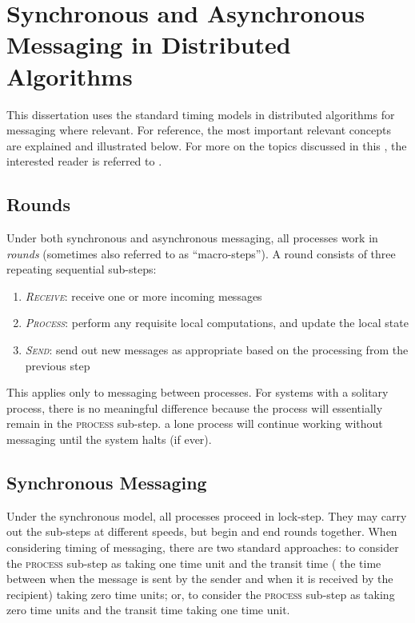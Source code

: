 \section{\label{sec:back:syncasync}Synchronous and Asynchronous Messaging in Distributed Algorithms}

This dissertation uses the standard timing models in distributed algorithms \cite{Lynch1996} for messaging where relevant.  For reference, the most important relevant concepts are explained and illustrated below.  For more on the topics discussed in this , the interested reader is referred to \cite{Fokkink2013,Lynch1996,Tel2000}.

\subsection{Rounds}
Under both synchronous and asynchronous messaging, all processes work in \emph{rounds} (sometimes also referred to as ``macro-steps'').  A round consists of three repeating sequential sub-steps:
\begin{enumerate}
    \item \emph{\textsc{Receive}}:  receive one or more incoming messages
    \item \emph{\textsc{Process}}:  perform any requisite local computations, and update the local state
    \item \emph{\textsc{Send}}:  send out new messages as appropriate based on the processing from the previous step
\end{enumerate}
This applies only to messaging between processes.  For systems with a solitary process, there is no meaningful difference because the process will essentially remain in the \textsc{process} sub-step.  \Ie{} a lone process will continue working without messaging until the system halts (if ever).

\subsection{Synchronous Messaging}
Under the synchronous model, all processes proceed in lock-step.  They may carry out the sub-steps at different speeds, but begin and end rounds together.  When considering timing of messaging, there are two standard approaches:  to consider the \textsc{process} sub-step as taking one time unit and the transit time (\ie{} the time between when the message is sent by the sender and when it is received by the recipient) taking zero time units; or, to consider the \textsc{process} sub-step as taking zero time units and the transit time taking one time unit.

